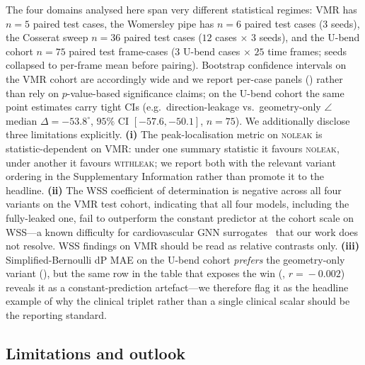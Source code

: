 \documentclass[10pt,a4paper]{article}
\newcommand{\withleak}{\textsc{withleak}}
\newcommand{\noleak}{\textsc{noleak}}
\begin{document}
The four domains analysed here span very different statistical
regimes: VMR has $n=5$ paired test cases, the Womersley pipe has
$n=6$ paired test cases ($3$ seeds), the Cosserat sweep $n=36$
paired test cases ($12$ cases $\times$ $3$ seeds), and the U-bend
cohort $n=75$ paired test frame-cases ($3$ U-bend cases $\times$ $25$ time frames; seeds collapsed to per-frame mean before pairing). Bootstrap confidence intervals on
the VMR cohort are accordingly wide and we report per-case panels
() rather than rely on $p$-value-based
significance claims; on the U-bend cohort the same point estimates
carry tight CIs (e.g.\ direction-leakage vs.\ geometry-only $\angle$
median $\Delta = -53.8^\circ$, $95\%$ CI $[-57.6,-50.1]$, $n=75$).
We additionally disclose three limitations explicitly. \textbf{(i)}
The peak-localisation metric on \noleak{} is statistic-dependent on
VMR: under one summary statistic it favours \noleak{}, under another
it favours \withleak{}; we report both with the relevant variant
ordering in the Supplementary Information rather than promote it
to the headline. \textbf{(ii)} The WSS coefficient of determination
is negative across all four variants on the VMR test cohort,
indicating that all four models, including the fully-leaked one,
fail to outperform the constant predictor at the cohort scale on
WSS---a known difficulty for cardiovascular GNN
surrogates~\cite{tabe2026pignn} that our work does not resolve.
WSS findings on VMR should be read as relative contrasts only.
\textbf{(iii)} Simplified-Bernoulli dP MAE on the U-bend cohort
\emph{prefers} the geometry-only variant (),
but the same row in the table that exposes the win
(, $r\!=\!-0.002$) reveals it as a
constant-prediction artefact---we therefore flag it as the
headline example of why the clinical triplet rather than a single
clinical scalar should be the reporting standard.

\subsection*{Limitations and outlook}
\end{document}
